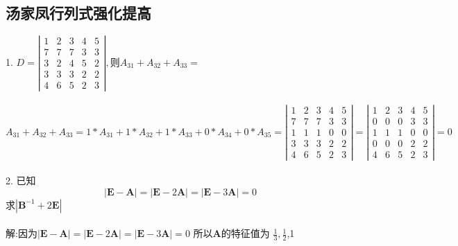 \documentclass[a4paper,fleqn]{article}
\begin{document}
\subsection{汤家凤行列式强化提高}
1. $D=\left|\begin{array}{ccccc}{1} & {2} & {3} & {4} & {5} \\ {7} & {7} & {7} & {3} & {3} \\ {3} & {2} & {4} & {5} & {2} \\ {3} & {3} & {3} & {2} & {2} \\ {4} & {6} & {5} & {2} & {3}\end{array}\right|, \text {则} A_{31}+A_{32}+A_{33}=$ \\ \\
$A_{31}+A_{32}+A_{33}=1*A_{31}+1*A_{32}+1*A_{33}+0*A_{34}+0*A_{35} = \left|\begin{array}{ccccc}{1} & {2} & {3} & {4} & {5} \\ {7} & {7} & {7} & {3} & {3} \\ {1} & {1} & {1} & {0} & {0} \\ {3} & {3} & {3} & {2} & {2} \\ {4} & {6} & {5} & {2} & {3} \end{array}\right| = \left|\begin{array}{lllll}{1} & {2} & {3} & {4} & {5} \\ {0} & {0} & {0} & {3} & {3} \\ {1} & {1} & {1} & {0} & {0} \\ {0} & {0} & {0} & {2} & {2} \\ {4} & {6} & {5} & {2} & {3}\end{array}\right|=0$ \\ \\
2.
已知
\begin{equation}|\boldsymbol{E}-\boldsymbol{A}|=|\boldsymbol{E}-2 \boldsymbol{A}|=|\boldsymbol{E}-3 \boldsymbol{A}|=0
\end{equation}
 求$ \left|\boldsymbol{B}^{-1}+2 \boldsymbol{E}\right|$ \\ \\
解:因为$|\boldsymbol{E}-\boldsymbol{A}|=|\boldsymbol{E}-2 \boldsymbol{A}|=|\boldsymbol{E}-3 \boldsymbol{A}|=0$
所以$\boldsymbol{A}$的特征值为 $\frac{1}{3},\frac{1}{2}$,1
\end{document}
